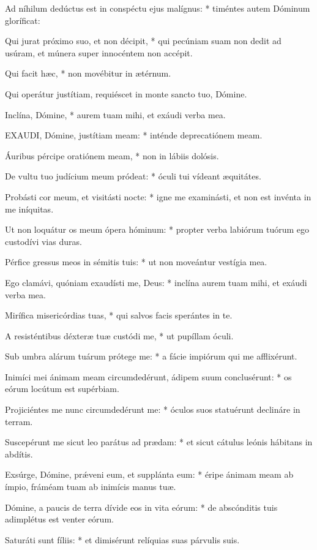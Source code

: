 Ad níhilum dedúctus est in conspéctu ejus malígnus: * timéntes autem Dóminum gloríficat:

Qui jurat próximo suo, et non décipit, * qui pecúniam suam non dedit ad usúram, et múnera super innocéntem non accépit.

Qui facit hæc, * non movébitur in ætérnum.

 Qui operátur justítiam, requiéscet in monte sancto tuo, Dómine.

 Inclína, Dómine, * aurem tuam mihi, et exáudi verba mea.


\lettrine[lines=2]{E}{XAUDI}, Dómine, justítiam meam: * inténde deprecatiónem meam.

Áuribus pércipe oratiónem meam, * non in lábiis dolósis.

De vultu tuo judícium meum pródeat: * óculi tui vídeant æquitátes.

Probásti cor meum, et visitásti nocte: * igne me examinásti, et non est invénta in me iníquitas.

Ut non loquátur os meum ópera hóminum: * propter verba labiórum tuórum ego custodívi vias duras.

Pérfice gressus meos in sémitis tuis: * ut non moveántur vestígia mea.

Ego clamávi, quóniam exaudísti me, Deus: * inclína aurem tuam mihi, et exáudi verba mea.

Mirífica misericórdias tuas, * qui salvos facis sperántes in te.

A resisténtibus déxteræ tuæ custódi me, * ut pupíllam óculi.

Sub umbra alárum tuárum prótege me: * a fácie impiórum qui me afflixérunt.

Inimíci mei ánimam meam circumdedérunt, ádipem suum conclusérunt: * os eórum locútum est supérbiam.

Projiciéntes me nunc circumdedérunt me: * óculos suos statuérunt declináre in terram.

Suscepérunt me sicut leo parátus ad prædam: * et sicut cátulus leónis hábitans in abdítis.

Exsúrge, Dómine, prǽveni eum, et supplánta eum: * éripe ánimam meam ab ímpio, fráméam tuam ab inimícis manus tuæ.

Dómine, a paucis de terra dívide eos in vita eórum: * de abscónditis tuis adimplétus est venter eórum.

Saturáti sunt fíliis: * et dimisérunt relíquias suas párvulis suis.

